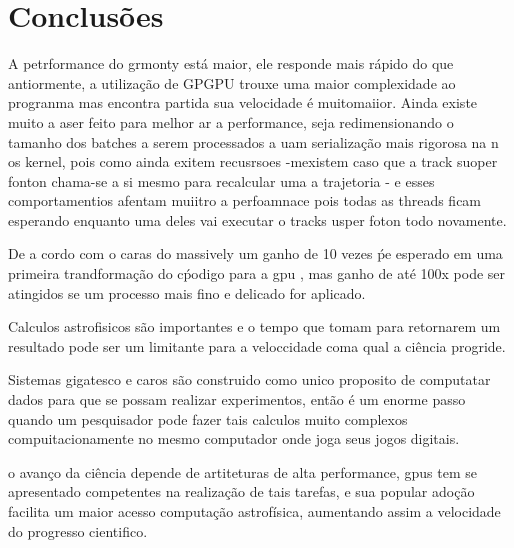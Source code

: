 \chapter{Conclusões}
\label{cap:conclusoes}

A petrformance do grmonty está maior, ele responde mais rápido do que antiormente, a utilização de GPGPU trouxe uma maior complexidade ao progranma mas encontra partida sua velocidade é muitomaiior. Ainda existe muito a aser feito para melhor ar a performance, seja redimensionando o tamanho dos batches a serem processados a uam serialização mais rigorosa na n os kernel, pois como ainda exitem recusrsoes -mexistem caso que a track suoper fonton chama-se a si mesmo para recalcular uma a trajetoria - e esses comportamentios afentam muiitro a perfoamnace pois todas as threads ficam esperando enquanto uma deles vai executar o tracks usper foton todo novamente.

De a cordo com o caras do massively um ganho de 10 vezes ṕe esperado em uma primeira trandformação do cṕodigo para a gpu , mas ganho de até 100x pode ser atingidos se um processo mais fino e delicado for aplicado.



Calculos astrofisicos são importantes e o tempo que tomam para retornarem um resultado pode ser um limitante para a veloccidade coma qual a ciência progride.

Sistemas gigatesco e caros são construido como  unico proposito de computatar dados para que se possam realizar experimentos, então é um enorme passo quando um pesquisador pode fazer tais calculos muito complexos compuitacionamente no mesmo computador onde joga seus jogos digitais.

o avanço da ciência depende de artiteturas de alta performance, gpus tem se apresentado competentes na realização de tais tarefas, e sua popular adoção facilita um maior acesso computação astrofísica, aumentando assim a velocidade do progresso cientifico.
